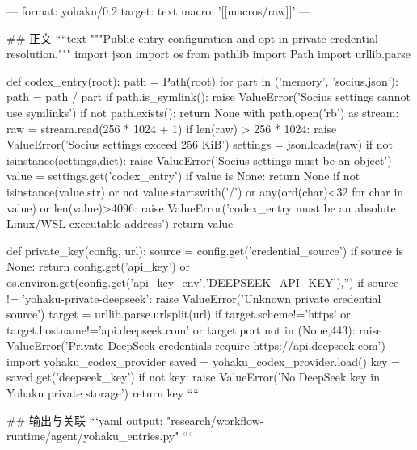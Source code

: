 ---
format: yohaku/0.2
target: text
macro: '[[macros/raw]]'
---

## 正文
````text
"""Public entry configuration and opt-in private credential resolution."""
import json
import os
from pathlib import Path
import urllib.parse


def codex_entry(root):
    path = Path(root)
    for part in ('memory', 'socius.json'):
        path = path / part
        if path.is_symlink():
            raise ValueError('Socius settings cannot use symlinks')
    if not path.exists():
        return None
    with path.open('rb') as stream:
        raw = stream.read(256 * 1024 + 1)
    if len(raw) > 256 * 1024:
        raise ValueError('Socius settings exceed 256 KiB')
    settings = json.loads(raw)
    if not isinstance(settings,dict):
        raise ValueError('Socius settings must be an object')
    value = settings.get('codex_entry')
    if value is None:
        return None
    if not isinstance(value,str) or not value.startswith('/') or any(ord(char)<32 for char in value) or len(value)>4096:
        raise ValueError('codex_entry must be an absolute Linux/WSL executable address')
    return value


def private_key(config, url):
    source = config.get('credential_source')
    if source is None:
        return config.get('api_key') or os.environ.get(config.get('api_key_env','DEEPSEEK_API_KEY'),'')
    if source != 'yohaku-private-deepseek':
        raise ValueError('Unknown private credential source')
    target = urllib.parse.urlsplit(url)
    if target.scheme!='https' or target.hostname!='api.deepseek.com' or target.port not in (None,443):
        raise ValueError('Private DeepSeek credentials require https://api.deepseek.com')
    import yohaku_codex_provider
    saved = yohaku_codex_provider.load()
    key = saved.get('deepseek_key')
    if not key:
        raise ValueError('No DeepSeek key in Yohaku private storage')
    return key
````

## 输出与关联
```yaml
output: "research/workflow-runtime/agent/yohaku_entries.py"
```
